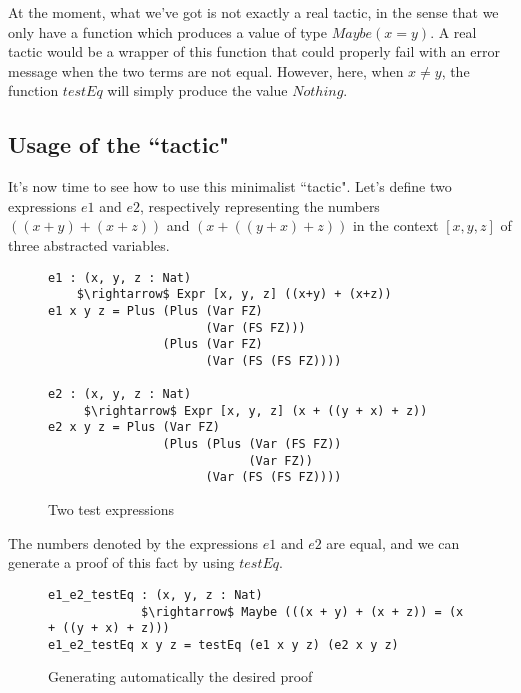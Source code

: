 At the moment, what we've got is not exactly a real tactic, in the sense that we only have a function which produces a value of type $Maybe (x = y)$. A real tactic would be a wrapper of this function that could properly fail with an error message when the two terms are not equal. However, here, when $x\ne y$, the function $testEq$ will simply produce the value $Nothing$. \\

\subsection{Usage of the ``tactic"}

It's now time to see how to use this minimalist ``tactic".
Let's define two expressions $e1$ and $e2$, respectively representing the numbers $((x + y) + (x + z))$ and $(x + ((y + x) + z))$ in the context $[x, y, z]$ of three abstracted variables.


\begin{figure}[H]
\figrule
\begin{center}
\begin{lstlisting}
e1 : (x, y, z : Nat) 
    $\rightarrow$ Expr [x, y, z] ((x+y) + (x+z))
e1 x y z = Plus (Plus (Var FZ) 
                      (Var (FS FZ))) 
                (Plus (Var FZ) 
                      (Var (FS (FS FZ))))

e2 : (x, y, z : Nat) 
     $\rightarrow$ Expr [x, y, z] (x + ((y + x) + z))
e2 x y z = Plus (Var FZ) 
                (Plus (Plus (Var (FS FZ)) 
                            (Var FZ)) 
                      (Var (FS (FS FZ))))
\end{lstlisting}
\end{center}
\caption{Two test expressions}
\label{e1_e2}
\figrule
\end{figure}

The numbers denoted by the expressions $e1$ and $e2$ are equal, and we can generate a proof of this fact by using $testEq$.

\begin{figure}[H]
\figrule
\begin{center}
\begin{lstlisting}
e1_e2_testEq : (x, y, z : Nat) 
             $\rightarrow$ Maybe (((x + y) + (x + z)) = (x + ((y + x) + z)))
e1_e2_testEq x y z = testEq (e1 x y z) (e2 x y z)
\end{lstlisting}
\end{center}
\caption{Generating automatically the desired proof}
\label{e1_e2_testEq}
\figrule
\end{figure}



